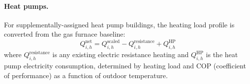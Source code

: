 \paragraph{Heat pumps.}
For supplementally-assigned heat pump buildings, the heating load profile is converted from the gas furnace baseline:
\begin{equation}
Q_{i,h}^{\text{net}} = Q_{i,h}^{\text{scaled}} - Q_{i,h}^{\text{resistance}} + Q_{i,h}^{\text{HP}}
\end{equation}
where $Q_{i,h}^{\text{resistance}}$ is any existing electric resistance heating and $Q_{i,h}^{\text{HP}}$ is the heat pump electricity consumption, determined by heating load and COP (coefficient of performance) as a function of outdoor temperature.

